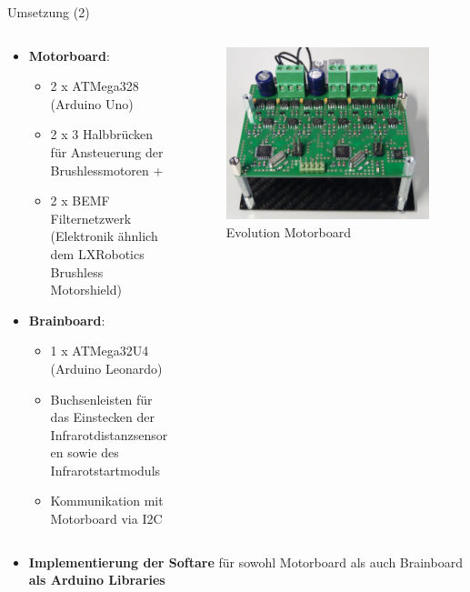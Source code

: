 \documentclass{beamer}
\begin{document}
\begin{frame}{Umsetzung (2)}
\begin{columns}
	\begin{column}{0.8\textwidth}
\begin{itemize}
	\item \textbf{Motorboard}:
	\begin{itemize}
		\item 2 x ATMega328 (Arduino Uno)
		\item 2 x 3 Halbbr\"ucken f\"ur Ansteuerung der Brushlessmotoren +
		\item 2 x BEMF Filternetzwerk (Elektronik \"ahnlich dem LXRobotics Brushless Motorshield)
	\end{itemize}
\end{itemize}
\begin{itemize}
	\item \textbf{Brainboard}:
	\begin{itemize}
		\item 1 x ATMega32U4 (Arduino Leonardo)
		\item Buchsenleisten f\"ur das Einstecken der Infrarotdistanzsensoren sowie des Infrarotstartmoduls
		\item Kommunikation mit Motorboard via I2C
	\end{itemize}
\end{itemize}
	\end{column}
	\begin{column}{0.2\textwidth}
		\begin{figure}
			\centering
			\includegraphics[width=1.0\textwidth]{./images/evolution-motorboard.jpg}
			\caption{Evolution Motorboard}
		\end{figure}
	\end{column}
\end{columns}
\vspace{20px}
\begin{itemize}
	\item \textbf{Implementierung der Softare} f\"ur sowohl Motorboard als auch Brainboard \textbf{als Arduino Libraries}
\end{itemize}
\end{frame}
\end{document}
